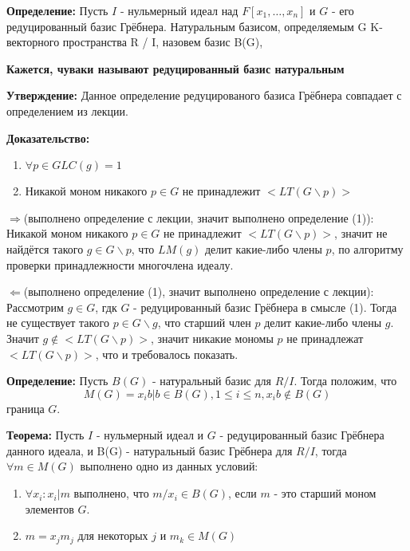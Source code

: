 \documentclass{article}
\begin{document}
    \textbf{Определение:} Пусть $I$ - нульмерный идеал над $F[x_1,\ldots,x_n]$ и $G$ - его редуцированный базис Грёбнера.
    Натуральным базисом, определяемым G K-векторного пространства R / I, назовем базис B(G),
    
    \textbf{Кажется, чуваки называют редуцированный базис натуральным}
        
    \textbf{Утверждение:} Данное определение редуцированого базиса Грёбнера совпадает с определением из лекции.  

    \textbf{Доказательство:} 
        \begin{enumerate}
            \item $\forall p \in G LC(g) = 1$ 
            \item Никакой моном никакого $p \in G$ не принадлежит $<LT(G\backslash{p})>$ 
        \end{enumerate}

    $\Rightarrow$(выполнено определение с лекции, значит выполнено определение (1)):
        Никакой моном никакого $p \in G$ не принадлежит $<LT(G\backslash{p})>$, значит не найдётся такого $g \in G\backslash{p}$, что 
        $LM(g)$ делит какие-либо члены $p$, по алгоритму проверки принадлежности многочлена идеалу.

    $\Leftarrow$(выполнено определение (1), значит выполнено определение с лекции):
        Рассмотрим $g \in G$, гдк $G$ - редуцированный базис Грёбнера в смысле (1). Тогда не существует такого $p \in G\backslash{g}$,
        что старший член $p$ делит какие-либо члены $g$. Значит $g \notin <LT(G\backslash{p})>$, значит никакие мономы $p$ 
        не принадлежат $<LT(G\backslash{p})>$, что и требовалось показать.

    
    \textbf{Определение:} Пусть $B(G)$ - натуральный базис для $R/I$. Тогда положим, что
    $$M(G) = {x_ib | b \in B(G), 1\leq i \leq n, x_ib \notin B(G)}$$ граница $G$.

    \newpage

    \textbf{Теорема:} Пусть $I$ - нульмерный идеал и $G$ - редуцированный базис Грёбнера данного идеала, и
    B(G) - натуральный базис Грёбнера для $R/I$, тогда $\forall m \in M(G)$ выполнено одно из данных условий:

    \begin{enumerate}
        \item $\forall x_i : x_i | m$ выполнено, что $m/x_i \in B(G)$, если $m$ - это старший моном элементов $G$.
        \item $m = x_jm_j$ для некоторых $j$ и $m_k \in M(G)$
    \end{enumerate}
\end{document}
